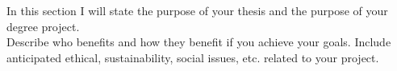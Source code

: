 In this section I will state the purpose of your thesis and the purpose of your degree project.\\
Describe who benefits and how they benefit if you achieve your goals. Include anticipated ethical, sustainability, social issues, etc. related to your project.
